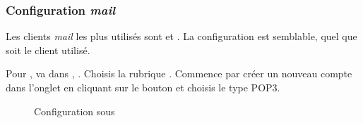 \pagebreak

\subsubsection{Configuration \emph{mail}}

 Les clients \emph{mail} les plus
utilis\'es sont  et . La configuration est semblable, quel que soit le
client utilis\'e.

Pour , va dans , . Choisis la
rubrique . Commence par cr\'eer un nouveau compte dans
l'onglet  en cliquant sur le bouton
 et choisis le type POP3.


\noindent
  \begin{figure}[!h]
    \begin{center}  
         	 \caption{Configuration sous }
    \end{center}
  \end{figure}


